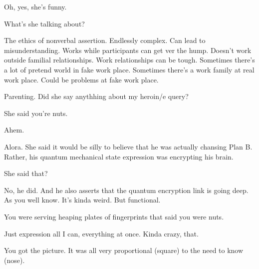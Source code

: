 

Oh, yes, she's funny.

What's she talking about?

The ethics of nonverbal assertion.  Endlessly complex.  Can lead to
misunderstanding.  Works while participants can get ver the hump.
Doesn't work outside familial relationships.  Work relationships can
be tough.  Sometimes there's a lot of pretend world in fake work
place.  Sometimes there's a work family at real work place.  Could be
problems at fake work place.

Parenting.  Did she say anythhing about my heroin/e query?  

She said you're nuts.

Ahem.

Alora.  She said it would be silly to believe that he was actually
chansing Plan B.  Rather, his quantum mechanical state expression was
encrypting his brain.

She said that?

No, he did.  And he also asserts that the quantum encryption link is
going deep.  As you well know.  It's kinda weird.  But functional.

You were serving heaping plates of fingerprints that said you were
nuts.  

Just expression all I can, everything at once.  Kinda crazy, that.

You got the picture.  It was all very proportional (square) to the
need to know (nose).

\bye
